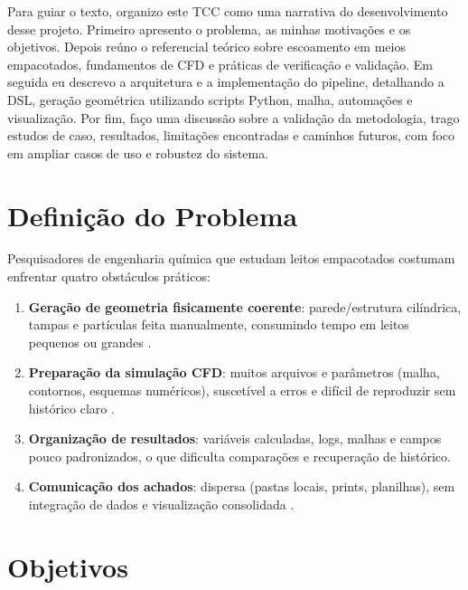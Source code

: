 Para guiar o texto, organizo este TCC como uma narrativa do desenvolvimento desse projeto. Primeiro apresento o problema, as minhas motivações e os objetivos. Depois reúno o referencial teórico sobre escoamento em meios empacotados, fundamentos de CFD e práticas de verificação e validação. Em seguida eu descrevo a arquitetura e a implementação do pipeline, detalhando a DSL, geração geométrica utilizando scripts Python, malha, automações e visualização. Por fim, faço uma discussão sobre a validação da metodologia, trago estudos de caso, resultados, limitações encontradas e caminhos futuros, com foco em ampliar casos de uso e robustez do sistema.

\section{Definição do Problema}

Pesquisadores de engenharia química que estudam leitos empacotados costumam enfrentar quatro obstáculos práticos:

\begin{enumerate}
    \item \textbf{Geração de geometria fisicamente coerente}: parede/estrutura cilíndrica, tampas e partículas feita manualmente, consumindo tempo em leitos pequenos ou grandes \cite{blender2021}.
    
    \item \textbf{Preparação da simulação CFD}: muitos arquivos e parâmetros (malha, contornos, esquemas numéricos), suscetível a erros e difícil de reproduzir sem histórico claro \cite{openfoam2023}.
    
    \item \textbf{Organização de resultados}: variáveis calculadas, logs, malhas e campos pouco padronizados, o que dificulta comparações e recuperação de histórico.
    
    \item \textbf{Comunicação dos achados}: dispersa (pastas locais, prints, planilhas), sem integração de dados e visualização consolidada \cite{fastapi2021}.
\end{enumerate}

\section{Objetivos}

